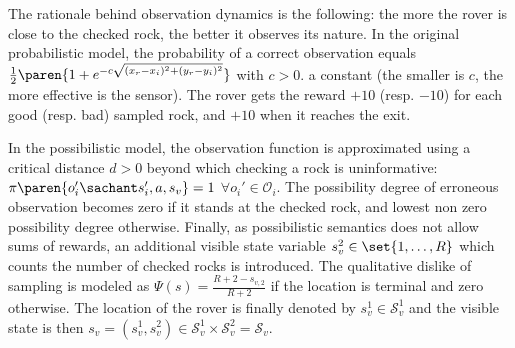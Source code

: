 The rationale behind observation dynamics is the following: 
the more the rover is close to
the checked rock, the better it observes its nature. 
In the original
probabilistic model, 
the probability of a correct observation equals
$\frac{1}{2}\paren{ 1 + e^{-c \sqrt{(x_r-x_i)^2 + (y_r-y_i)^2} }} $ with $c>0$.
 a constant (the smaller is $c$, the more effective is the sensor). 
The rover gets the reward $+10$ (resp. $-10$) for each good (resp. bad) sampled rock, %
and $+10$ when it reaches the exit. 

In the possibilistic model, the observation function is approximated using a
critical distance $d>0$ beyond which checking a rock is uninformative: $\pi
\paren{ o_i' \sachant s_i',a,s_v } = 1$ $ \forall o_i' \in \mathcal{O}_{i} $.
The possibility degree of
erroneous observation becomes zero if it stands at
the checked rock, and lowest non zero possibility degree otherwise. Finally, 
as possibilistic semantics does not allow sums of
rewards, an additional visible state variable $s^2_v \in
\set{ 1, \ldots, R }$ which counts the number of checked rocks is introduced. 
The qualitative dislike of sampling is modeled as $\Psi(s)=\frac{R+2-s_{v,2}}{R+2}$
if the location is terminal and zero otherwise. 
The location of the rover is finally denoted by $s^1_v \in \mathcal{S}^1_v$ and the visible state is then
$s_v=(s^1_v,s^2_v) \in \mathcal{S}^1_v \times \mathcal{S}^2_v = \mathcal{S}_v$. 

